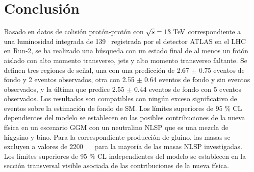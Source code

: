 \chapter{Conclusión}

Basado en datos de colisión protón-protón con $\sqrt{s}=13\ \text{TeV}$ correspondiente a una luminosidad integrada de 139 \ifb\ registrada por el detector ATLAS
en el LHC en Run-2, se ha realizado una búsqueda con un estado final de al menos un fotón aislado con alto momento transverso, jets y alto momento transverso faltante. Se definen tres regiones de señal, una con una predicción de 2.67 $\pm$ 0.75 eventos de fondo y 2 eventos observados, otra con 2.55 $\pm$ 0.64 eventos de fondo y sin eventos observados, y la última que predice 2.55 $\pm$ 0.44 eventos de fondo con 5 eventos observados.
Los resultados son compatibles con ningún exceso significativo de eventos sobre la estimación de fondo de SM. Los límites superiores de 95 \% CL dependientes del modelo se establecen en las posibles contribuciones de la nueva física en un escenario GGM con un neutralino NLSP que es una mezcla de higgsino y bino. Para la correspondiente producción de gluino, las masas se excluyen a valores de 2200 ~ \gev\ para la mayoría de las masas NLSP investigadas. Los límites superiores de 95 \% CL independientes del modelo se establecen en la sección transversal visible asociada de las contribuciones de la nueva física.
